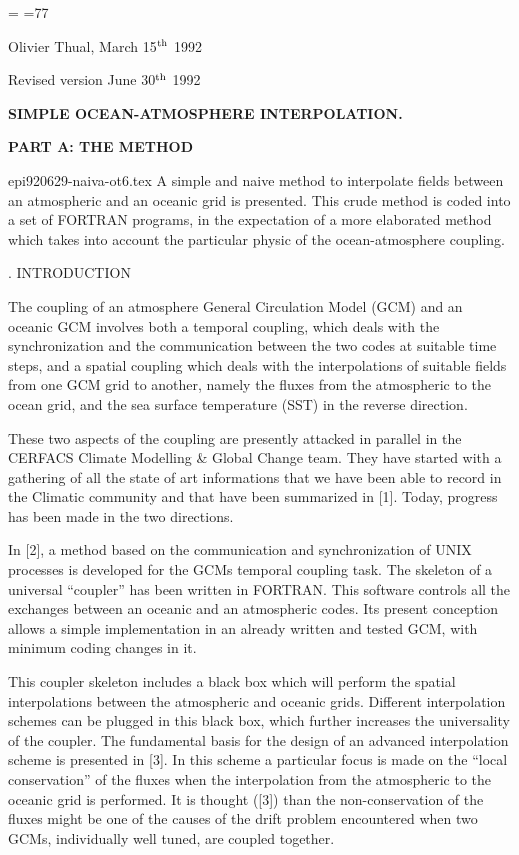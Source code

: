  \magnification =
=77



\centerline{ Olivier Thual, March 15$^{\rm th}$ 1992}
\centerline{ Revised version  June 30$^{\rm th}$ 1992}
 \bigskip

\centerline{\bf SIMPLE OCEAN-ATMOSPHERE INTERPOLATION.}  
\centerline{\bf PART A: THE METHOD}

\bigskip
 epi920629-naiva-ot6.tex
A simple and naive method to interpolate fields between an atmospheric
and an oceanic grid is presented. This crude method is coded into a set of
FORTRAN programs, in the expectation  of a more elaborated method which
takes into account the particular physic of the ocean-atmosphere coupling. 



. INTRODUCTION 

The coupling of an atmosphere General Circulation Model (GCM) and an 
oceanic GCM involves both a temporal coupling,  which  deals  with
the synchronization and the communication between  the two codes at
suitable time steps, and a spatial coupling which  deals with the
interpolations of suitable fields from one GCM grid to another, namely the
fluxes from the atmospheric to the ocean grid, and the sea surface
temperature (SST) in the reverse direction.  



These two aspects of the coupling are presently attacked in parallel in the
CERFACS Climate Modelling \& Global Change team.  They have started
with a gathering of all the state of art informations that we have been
able to record in the Climatic community and that have been summarized
in [1]. Today, progress has been made  in the two directions.

 In [2], a method based on the communication and synchronization of  UNIX
processes is developed for the GCMs temporal coupling task. The skeleton
of a universal ``coupler'' has been written in FORTRAN.
This software 
controls all  the exchanges between an oceanic and an atmospheric codes.
Its present conception allows a simple
implementation in an already written and tested GCM, with   minimum
coding changes in it.



This coupler skeleton includes a black box which will  perform the spatial
interpolations between the atmospheric and  oceanic grids. Different 
interpolation schemes can be plugged in this black box, which further
increases the universality of the coupler.  The fundamental basis for the
design of an advanced interpolation scheme is presented in [3]. In this
scheme a particular focus is made on the ``local conservation'' of the
fluxes when the interpolation from the atmospheric to the oceanic grid is
performed. It is thought ([3]) than the non-conservation of the fluxes
might be one of the causes of  the drift problem encountered when two  GCMs,
individually well tuned, are coupled together. 



